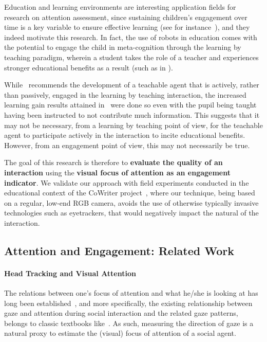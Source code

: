 \documentclass{sig-alternate}
\begin{document}
Education and learning environments are interesting application fields for
research on attention assessment, since sustaining children's engagement over
time is a key variable to ensure effective learning (see for
instance~\cite{Umbach}), and they indeed motivate this research. In fact, the
use of robots in education comes with the potential to engage the child in
meta-cognition through the learning by teaching paradigm, wherein a student
takes the role of a teacher and experiences stronger educational benefits as a
result (such as in \cite{Palinscar1984}).

While~\cite{zhao2012learning} recommends the development of a teachable agent
that is actively, rather than passively, engaged in the learning by teaching
interaction, the increased learning gain results attained
in~\cite{okita2006observation} were done so even with the pupil being taught
having been instructed to not contribute much information. This suggests that it
may not be necessary, from a learning by teaching point of view, for the
teachable agent to participate actively in the interaction to incite educational
benefits. However, from an engagement point of view, this may not necessarily be
true.

The goal of this research is therefore to \textbf{evaluate the quality of an
interaction} using the \textbf{visual focus of attention as an engagement
indicator}. We validate our approach with field experiments conducted in the
educational context of the CoWriter project~\cite{Hood:2015}, where our
technique, being based on a regular, low-end RGB camera, avoids the use of
otherwise typically invasive technologies such as eyetrackers, that would
negatively impact the natural of the interaction.

\subsection*{Attention and Engagement: Related Work}

\paragraph{Head Tracking and Visual Attention}

The relations between one's focus of attention and what he/she is looking at has
long been established~\cite{yarbus1967eye,barber1976perception}, and more
specifically, the existing relationship between gaze and attention during social
interaction and the related gaze patterns, belongs to classic textbooks
like~\cite{argyle1969social}. As such, measuring the direction of gaze is
a natural proxy to estimate the (visual) focus of attention of a social agent.
\end{document}
